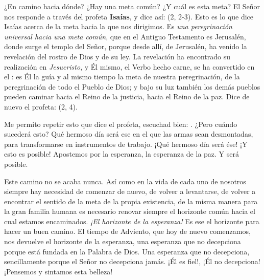 \begin{body}
¿En camino hacia dónde? ¿Hay una meta común? ¿Y cuál es esta meta? El Señor nos responde a través del profeta \textbf{Isaías}, y dice así:  (2, 2-3). Esto es lo que dice Isaías acerca de la meta hacia la que nos dirigimos. Es \emph{una peregrinación universal hacia una meta común}, que en el Antiguo Testamento es Jerusalén, donde surge el templo del Señor, porque desde allí, de Jerusalén, ha venido la revelación del rostro de Dios y de su ley. La revelación ha encontrado su realización en \emph{Jesucristo}, y Él mismo, el Verbo hecho carne, se ha convertido en el : es Él la guía y al mismo tiempo la meta de nuestra peregrinación, de la peregrinación de todo el Pueblo de Dios; y bajo su luz también los demás pueblos pueden caminar hacia el Reino de la justicia, hacia el Reino de la paz. Dice de nuevo el profeta:  (2, 4).

Me permito repetir esto que dice el profeta, escuchad bien: . ¿Pero cuándo sucederá esto? Qué hermoso día será ese en el que las armas sean desmontadas, para transformarse en instrumentos de trabajo. ¡Qué hermoso día será ése! ¡Y esto es posible! Apostemos por la esperanza, la esperanza de la paz. Y será posible.

Este camino no se acaba nunca. Así como en la vida de cada uno de nosotros siempre hay necesidad de comenzar de nuevo, de volver a levantarse, de volver a encontrar el sentido de la meta de la propia existencia, de la misma manera para la gran familia humana es necesario renovar siempre el horizonte común hacia el cual estamos encaminados. \emph{¡El horizonte de la esperanza!} Es ese el horizonte para hacer un buen camino. El tiempo de Adviento, que hoy de nuevo comenzamos, nos devuelve el horizonte de la esperanza, una esperanza que no decepciona porque está fundada en la Palabra de Dios. Una esperanza que no decepciona, sencillamente porque el Señor no decepciona jamás. ¡Él es fiel!, ¡Él no decepciona! ¡Pensemos y sintamos esta belleza!


\end{body}
